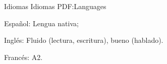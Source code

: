 \Section
{Idiomas}
{Idiomas}
{PDF:Languages}

\BulletItem
Español: Lengua nativa;

\Gap
\BulletItem
Inglés: Fluido (lectura, escritura), bueno (hablado).

\Gap
\BulletItem Francés: A2.
